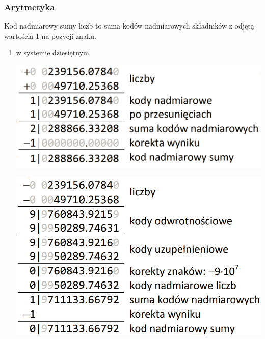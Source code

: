 \documentclass[12pt]{article}
\begin{document}
    \subsubsection{Arytmetyka}
    Kod nadmiarowy sumy liczb to suma kodów nadmiarowych
    składników z odjętą wartością 1 na pozycji znaku.
    
    \begin{enumerate}
        \item w systemie dziesiętnym
            \begin{center}
                \includegraphics[scale=0.4]{graphics/number-repr/nad-add-dec.png}
            \end{center}
            \begin{center}
                \includegraphics[scale=0.4]{graphics/number-repr/nad-add-dec-2.png}
            \end{center}
            

\end{enumerate}
\end{document}
